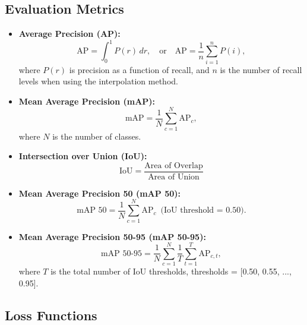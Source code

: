 \documentclass[a4paper]{article}
\begin{document}
\subsection{Evaluation Metrics}
\begin{itemize}
    \item \textbf{Average Precision (AP):} 
    \[
    \text{AP} = \int_0^1 P(r) \, dr, \quad \text{or} \quad 
    \text{AP} = \frac{1}{n} \sum_{i=1}^{n} P(i),
    \]
    where \( P(r) \) is precision as a function of recall, and \( n \) is the number of recall levels when using the interpolation method.

    \item \textbf{Mean Average Precision (mAP):} 
    \[
    \text{mAP} = \frac{1}{N} \sum_{c=1}^{N} \text{AP}_c,
    \]
    where \( N \) is the number of classes.

    \item \textbf{Intersection over Union (IoU):} 
    \[
    \text{IoU} = \frac{\text{Area of Overlap}}{\text{Area of Union}}
    \]

    \item \textbf{Mean Average Precision 50 (mAP 50):} 
    \[
    \text{mAP 50} = \frac{1}{N} \sum_{c=1}^{N} \text{AP}_c \, \text{ (IoU threshold = 0.50)}.
    \]

    \item \textbf{Mean Average Precision 50-95 (mAP 50-95):} 
    \[
    \text{mAP 50-95} = \frac{1}{N} \sum_{c=1}^{N} \frac{1}{T} \sum_{t=1}^{T} \text{AP}_{c,t},
    \]
    where \( T \) is the total number of IoU thresholds, thresholds = [0.50, 0.55, ..., 0.95].
\end{itemize}

\subsection{Loss Functions}
\end{document}
